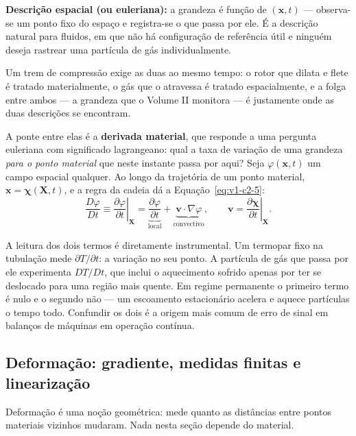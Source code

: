 \documentclass[12pt,a4paper]{article}
\numberwithin{equation}{section}
\numberwithin{table}{section}
\numberwithin{figure}{section}
\begin{document}
\textbf{Descrição espacial (ou euleriana):} a grandeza é função de
$(\mathbf{x},t)$ --- observa-se um ponto fixo do espaço e registra-se o que
passa por ele. É a descrição natural para fluidos, em que não há configuração
de referência útil e ninguém deseja rastrear uma partícula de gás
individualmente.

Um trem de compressão exige as duas ao mesmo tempo: o rotor que dilata e flete
é tratado materialmente, o gás que o atravessa é tratado espacialmente, e a
folga entre ambos --- a grandeza que o Volume II monitora --- é justamente onde
as duas descrições se encontram.

A ponte entre elas é a \textbf{derivada material}, que responde a uma pergunta
euleriana com significado lagrangeano: qual a taxa de variação de uma grandeza
\emph{para o ponto material} que neste instante passa por aqui? Seja
$\varphi(\mathbf{x},t)$ um campo espacial qualquer. Ao longo da trajetória de um
ponto material, $\mathbf{x} = \boldsymbol{\chi}(\mathbf{X},t)$, e a regra da
cadeia dá a Equação~\eqref{eq:v1-c2-5}:
\begin{equation}\label{eq:v1-c2-5}
\frac{D\varphi}{Dt} \equiv
\left.\frac{\partial \varphi}{\partial t}\right|_{\mathbf{X}} =
\underbrace{\frac{\partial \varphi}{\partial t}}_{\text{local}} +
\underbrace{\mathbf{v}\cdot\nabla\varphi}_{\text{convectivo}},
\qquad
\mathbf{v} = \left.\frac{\partial \boldsymbol{\chi}}{\partial t}\right|_{\mathbf{X}}.
\end{equation}

A leitura dos dois termos é diretamente instrumental. Um termopar fixo na
tubulação mede $\partial T/\partial t$: a variação no seu ponto. A partícula de
gás que passa por ele experimenta $DT/Dt$, que inclui o aquecimento sofrido
apenas por ter se deslocado para uma região mais quente. Em regime permanente o
primeiro termo é nulo e o segundo não --- um escoamento estacionário acelera e
aquece partículas o tempo todo. Confundir os dois é a origem mais comum de erro
de sinal em balanços de máquinas em operação contínua.

\subsection{Deformação: gradiente, medidas finitas e linearização}\label{sub:v1-c2-deformacao}

Deformação é uma noção geométrica: mede quanto as distâncias entre pontos
materiais vizinhos mudaram. Nada nesta seção depende do material.
\end{document}

